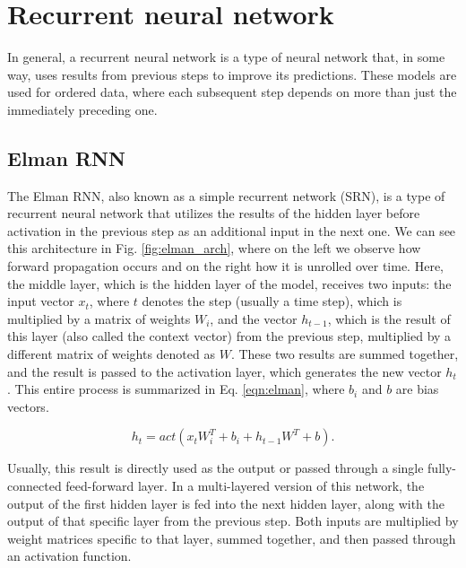 \section{Recurrent neural network}
\label{theoryRNN}

In general, a recurrent neural network is a type of neural network that, in some way, uses results from previous steps to improve its predictions. These models are used for ordered data, where each subsequent step depends on more than just the immediately preceding one.

\subsection{Elman RNN}

The Elman RNN, also known as a simple recurrent network (SRN), is a type of recurrent neural network that utilizes the results of the hidden layer before activation in the previous step as an additional input in the next one. We can see this architecture in Fig. \ref{fig:elman_arch}, where on the left we observe how forward propagation occurs and on the right how it is unrolled over time. Here, the middle layer, which is the hidden layer of the model, receives two inputs: the input vector $x_t$, where $t$ denotes the step (usually a time step), which is multiplied by a matrix of weights $W_i$, and the vector $h_{t-1}$, which is the result of this layer (also called the context vector) from the previous step, multiplied by a different matrix of weights denoted as $W$. These two results are summed together, and the result is passed to the activation layer, which generates the new vector $h_t$ \cite{elman}. This entire process is summarized in Eq. \ref{eqn:elman}, where $b_i$ and $b$ are bias vectors.

\begin{equation}
	\label{eqn:elman}
	h_t = act(x_t W^T_i + b_i + h_{t-1} W^T + b).
\end{equation} 

Usually, this result is directly used as the output or passed through a single fully-connected feed-forward layer. In a multi-layered version of this network, the output of the first hidden layer is fed into the next hidden layer, along with the output of that specific layer from the previous step. Both inputs are multiplied by weight matrices specific to that layer, summed together, and then passed through an activation function.

